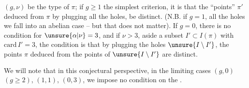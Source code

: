  $(g,\nu)$ be the type of $\pi$;  if $g\geq1$ the simplest criterion, it is that the ``\inserted{$\Gamma^{\natural}$-}points''  $\pi'$ deduced from $\pi$ by plugging all the holes, be distinct.  (N.B. if $g=1$,    all the holes we fall into an abelian case -- but that does not matter). If $g=0$,  there is no condition for $\unsure{\alpha|\nu}=3$, and if $\nu>3$,  aside a  subset $I'\subset I(\pi)$ with $\mathrm{card}\,I'=3$, the condition is that by plugging the holes  $\unsure{I\setminus I'}$, the \inserted{$\Gamma^{\natural}$-}points  $\pi$ deduced from the points of $\unsure{I\setminus I'}$ are distinct.

We will note that in this conjectural perspective, in the limiting cases $(g,0)$ $(g\geq2)$, $(1,1)$, $(0,3)$, we impose no condition  on the .

